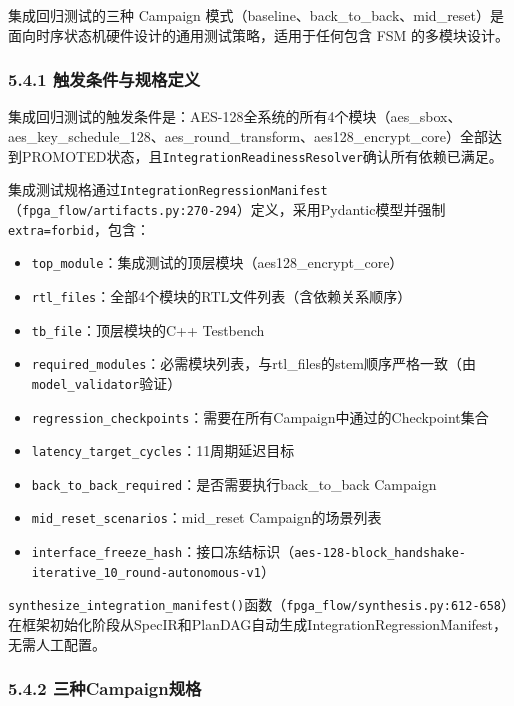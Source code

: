 集成回归测试的三种 Campaign
模式（baseline、back\_to\_back、mid\_reset）是面向时序状态机硬件设计的通用测试策略，适用于任何包含
FSM 的多模块设计。

\subsubsection{5.4.1
触发条件与规格定义}\label{ux89e6ux53d1ux6761ux4ef6ux4e0eux89c4ux683cux5b9aux4e49}

集成回归测试的触发条件是：AES-128全系统的所有4个模块（aes\_sbox、aes\_key\_schedule\_128、aes\_round\_transform、aes128\_encrypt\_core）全部达到PROMOTED状态，且\texttt{IntegrationReadinessResolver}确认所有依赖已满足。

集成测试规格通过\texttt{IntegrationRegressionManifest}（\texttt{fpga\_flow/artifacts.py:270-294}）定义，采用Pydantic模型并强制\texttt{extra=\textquotesingle{}forbid\textquotesingle{}}，包含：

\begin{itemize}
\tightlist
\item
  \texttt{top\_module}：集成测试的顶层模块（aes128\_encrypt\_core）
\item
  \texttt{rtl\_files}：全部4个模块的RTL文件列表（含依赖关系顺序）
\item
  \texttt{tb\_file}：顶层模块的C++ Testbench
\item
  \texttt{required\_modules}：必需模块列表，与rtl\_files的stem顺序严格一致（由\texttt{model\_validator}验证）
\item
  \texttt{regression\_checkpoints}：需要在所有Campaign中通过的Checkpoint集合
\item
  \texttt{latency\_target\_cycles}：11周期延迟目标
\item
  \texttt{back\_to\_back\_required}：是否需要执行back\_to\_back Campaign
\item
  \texttt{mid\_reset\_scenarios}：mid\_reset Campaign的场景列表
\item
  \texttt{interface\_freeze\_hash}：接口冻结标识（\texttt{aes-128-block\_handshake-iterative\_10\_round-autonomous-v1}）
\end{itemize}

\texttt{synthesize\_integration\_manifest()}函数（\texttt{fpga\_flow/synthesis.py:612-658}）在框架初始化阶段从SpecIR和PlanDAG自动生成IntegrationRegressionManifest，无需人工配置。

\subsubsection{5.4.2
三种Campaign规格}\label{ux4e09ux79cdcampaignux89c4ux683c}

